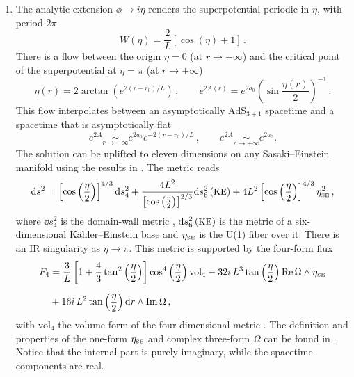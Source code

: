 \begin{enumerate}
\item The analytic extension $\phi\to i\eta$ renders the superpotential periodic in $\eta$, with period $2\pi$
\begin{equation}
	W(\eta)= \frac{2}{L}\left[\cos(\eta)+1\right]\,.
\end{equation}
There is a flow between the origin $\eta=0$ (at $r\to-\infty$) and the critical point of the superpotential at $\eta=\pi$ (at $r\to+\infty$)
\begin{equation}
	\eta(r) = 2\arctan{\left(e^{2 (r-r_0)/L}\right)}
	\,, \qquad
e^{2A(r)}=e^{2a_0} \left( \sin\frac{\eta(r)}{2}\right)^{-1}\,. 
\end{equation}
This flow interpolates between an asymptotically $\text{AdS}_{3+1}$ spacetime and a spacetime that is asymptotically flat
\begin{equation}
	e^{2A} \underset{r\to-\infty}{\sim} e^{2a_0}e^{-2(r-r_0)/L}
	\,,\qquad 
	e^{2A} \underset{r\to +\infty}{\sim} e^{2a_0}.
\end{equation}
The solution can be uplifted to eleven dimensions on any Sasaki--Einstein manifold using the results in \cite{Gauntlett:2009dn}.
The metric reads
\begin{align}
\mathrm{d} s^2=\left[\cos\left(\frac{\eta}{2}\right)\right]^{4/3}\mathrm{d} s_4^2+\frac{4L^2}{\left[\cos\left(\frac{\eta}{2}\right)\right]^{2/3}}\mathrm{d} s_6^2\left(\text{\small KE}\right)+4L^2\left[\cos\left(\frac{\eta}{2}\right)\right]^{4/3}\eta_{\text{\tiny SE}}^2\,,
\end{align}
where $\dd s_4^2$ is the domain-wall metric  , $\mathrm{d} s_6^2\left(\text{\small KE}\right)$ is the metric of a six-dimensional K\"ahler--Einstein base and $\eta_{\text{\tiny SE}}$ is the U(1) fiber over it.
There is an IR singularity as $\eta\to\pi$.
This metric is supported by the four-form flux  
\begin{align}
F_4&=\frac{3}{L}\left[1+\frac43\tan^2\left(\frac{\eta}{2}\right)\right]\cos^4\left(\frac{\eta}{2}\right)\text{vol}_4-32i\, L^3\tan\left(\frac{\eta}{2}\right)\operatorname{Re}\Omega\wedge\eta_{\text{\tiny SE}}\nonumber\\[2mm]
&+16i\, L^2\tan\left(\frac{\eta}{2}\right)\mathrm{d} r\wedge\operatorname{Im}\Omega\,,
\end{align}
with $\text{vol}_4$ the volume form of the four-dimensional metric .
The definition and properties of the one-form $\eta_{\text{\tiny SE}}$ and complex three-form $\Omega$ can be found in \cite{Gauntlett:2009dn}.
Notice that the internal part is purely imaginary, while the spacetime components are real. 


\end{enumerate}
